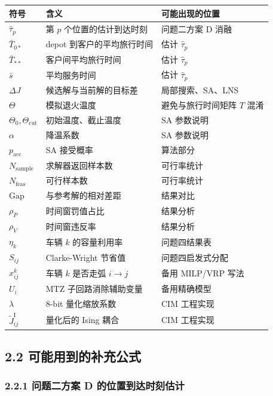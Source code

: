 \documentclass[
  a4paper,
]{ctexart}
\begin{document}
\begin{longtable}[]{@{}lll@{}}
\toprule\noalign{}
符号 & 含义 & 可能出现的位置 \\
\midrule\noalign{}
\endhead
\bottomrule\noalign{}
\endlastfoot
\(\widehat\tau_p\) & 第 \(p\) 个位置的估计到达时刻 & 问题二方案 D
消融 \\
\(\bar T_{0*}\) & depot 到客户的平均旅行时间 & 估计
\(\widehat\tau_p\) \\
\(\bar T_{**}\) & 客户间平均旅行时间 & 估计 \(\widehat\tau_p\) \\
\(\bar s\) & 平均服务时间 & 估计 \(\widehat\tau_p\) \\
\(\Delta J\) & 候选解与当前解的目标差 & 局部搜索、SA、LNS \\
\(\Theta\) & 模拟退火温度 & 避免与旅行时间矩阵 \(T\) 混淆 \\
\(\Theta_0,\Theta_{\mathrm{cut}}\) & 初始温度、截止温度 & SA 参数说明 \\
\(\alpha\) & 降温系数 & SA 参数说明 \\
\(p_{\mathrm{acc}}\) & SA 接受概率 & 算法部分 \\
\(N_{\mathrm{sample}}\) & 求解器返回样本数 & 可行率统计 \\
\(N_{\mathrm{feas}}\) & 可行样本数 & 可行率统计 \\
\(\mathrm{Gap}\) & 与参考解的相对差距 & 结果对比 \\
\(\rho_P\) & 时间窗罚值占比 & 结果分析 \\
\(\rho_V\) & 时间窗违反率 & 结果分析 \\
\(\eta_k\) & 车辆 \(k\) 的容量利用率 & 问题四结果表 \\
\(S_{ij}\) & Clarke-Wright 节省值 & 问题四启发式分配 \\
\(x_{ij}^k\) & 车辆 \(k\) 是否走弧 \(i\to j\) & 备用 MILP/VRP 写法 \\
\(U_i\) & MTZ 子回路消除辅助变量 & 备用精确模型 \\
\(\lambda\) & 8-bit 量化缩放系数 & CIM 工程实现 \\
\(\tilde J_{ij}^{\mathrm{I}}\) & 量化后的 Ising 耦合 & CIM 工程实现 \\
\end{longtable}

\subsection{2.2
可能用到的补充公式}\label{ux53efux80fdux7528ux5230ux7684ux8865ux5145ux516cux5f0f}

\subsubsection{2.2.1 问题二方案 D
的位置到达时刻估计}\label{ux95eeux9898ux4e8cux65b9ux6848-d-ux7684ux4f4dux7f6eux5230ux8fbeux65f6ux523bux4f30ux8ba1}
\end{document}
